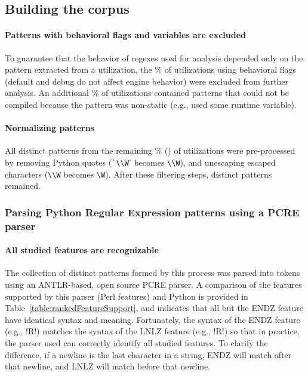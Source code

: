 \subsection{Building the corpus}
\paragraph{Patterns with behavioral flags and variables are excluded} To guarantee that the behavior of regexes used for analysis depended only on the pattern extracted from a utilization, the \%  of utilizations using behavioral flags (default and debug do not affect engine behavior) were excluded from further analysis.  An additional \% of utilizations contained patterns that could not be compiled because the pattern was non-static (e.g., used some runtime variable).

\paragraph{Normalizing patterns} All distinct patterns from the remaining \% () of utilizations were pre-processed by removing Python quotes (\verb!`\\W!' becomes \verb!\\W!), and unescaping escaped characters (\verb!\\W! becomes \verb!\W!).  After these filtering steps,  distinct patterns remained.

\subsubsection{Parsing Python Regular Expression patterns using a PCRE parser}
\paragraph{All studied features are recognizable} The collection of distinct patterns formed by this process was parsed into tokens using an ANTLR-based, open source PCRE parser.  A comparison of the features supported by this parser (Perl features) and Python is provided in Table~\ref{table:rankedFeatureSupport}, and indicates that all but the ENDZ feature have identical syntax and meaning.  Fortunately, the syntax of the ENDZ feature (e.g., \cverb!R\Z!) matches the syntax of the LNLZ feature (e.g., \cverb!R\Z!) so that in practice, the parser used can correctly identify all studied features.  To clarify the difference, if a newline is the last character in a string, ENDZ will match after that newline, and LNLZ will match before that newline.


